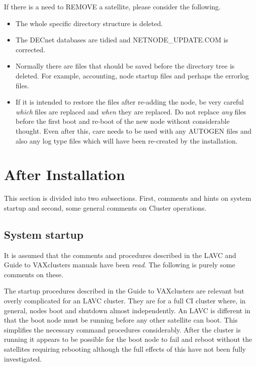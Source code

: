 If there is a need to REMOVE a satellite, please consider the following.
\begin {itemize}

\item The whole specific directory structure is deleted.
\item The DECnet databases are tidied and NETNODE\_UPDATE.COM is corrected.
\item Normally there are files that should be saved before the directory tree is
deleted.
For example, accounting, node startup files and perhaps the errorlog files.
\item If it is intended to restore the files after re-adding the node, be very
careful {\em which} files are replaced and {\em when} they are replaced.
Do not replace {\em any} files before the first boot and re-boot of the new
node without considerable thought.
Even after this, care needs to be used with any AUTOGEN files and also
any log type files which will have been re-created by the installation.
\end {itemize}

\section {After Installation}

This section is divided into two subsections.
First, comments and hints on system startup and second, some general comments
on Cluster operations.

\subsection {System startup}

It is assumed that the comments and procedures described in the LAVC and
Guide to VAXclusters manuals have been {\em read}.
The following is purely some comments on these.

The startup procedures described in the Guide to VAXclusters are relevant
but overly complicated for an LAVC cluster.
They are for a full CI cluster where, in general, nodes boot and shutdown
almost independently.
An LAVC is different in that the boot node must be running before any other
satellite can boot.
This simplifies the necessary command procedures considerably.
After the cluster is running it appears to be possible for the  boot node
to fail and reboot without the satellites requiring rebooting although
the full effects of this have not been fully investigated.


